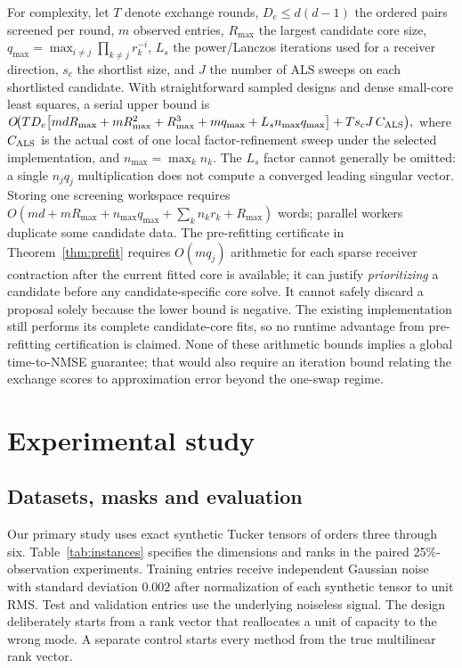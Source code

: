 \documentclass[review,10pt]{elsarticle}
\begin{document}
For complexity, let $T$ denote exchange rounds, $D_e\le d(d-1)$ the ordered pairs screened per round, $m$ observed entries, $R_{\max}$ the largest candidate core size, $q_{\max}=\max_{i\ne j}\prod_{k\ne j}r_k^{-i}$, $L_s$ the power/Lanczos iterations used for a receiver direction, $s_c$ the shortlist size, and $J$ the number of ALS sweeps on each shortlisted candidate. With straightforward sampled designs and dense small-core least squares, a serial upper bound is
 \(O\!\bigl(TD_e\bigl[mdR_{\max}+\allowbreak mR_{\max}^2+\allowbreak R_{\max}^3+\allowbreak mq_{\max}+\allowbreak L_s n_{\max}q_{\max}\bigr]+\allowbreak Ts_c J\,C_{\rm ALS}\bigr),\) 
where $C_{\rm ALS}$ is the actual cost of one local factor-refinement sweep under the selected implementation, and $n_{\max}=\max_k n_k$. The $L_s$ factor cannot generally be omitted: a single $n_jq_j$ multiplication does not compute a converged leading singular vector. Storing one screening workspace requires $O(md+mR_{\max}+n_{\max}q_{\max}+\sum_kn_kr_k+R_{\max})$ words; parallel workers duplicate some candidate data. The pre-refitting certificate in Theorem~\ref{thm:prefit} requires $O(mq_j)$ arithmetic for each sparse receiver contraction after the current fitted core is available; it can justify \emph{prioritizing} a candidate before any candidate-specific core solve. It cannot safely discard a proposal solely because the lower bound is negative. The existing implementation still performs its complete candidate-core fits, so no runtime advantage from pre-refitting certification is claimed. None of these arithmetic bounds implies a global time-to-NMSE guarantee; that would also require an iteration bound relating the exchange scores to approximation error beyond the one-swap regime.

\section{Experimental study}\label{sec:experiments}
\subsection{Datasets, masks and evaluation}\label{subsec:protocol}
Our primary study uses exact synthetic Tucker tensors of orders three through six. Table~\ref{tab:instances} specifies the dimensions and ranks in the paired 25\%-observation experiments. Training entries receive independent Gaussian noise with standard deviation $0.002$ after normalization of each synthetic tensor to unit RMS. Test and validation entries use the underlying noiseless signal. The design deliberately starts from a rank vector that reallocates a unit of capacity to the wrong mode. A separate control starts every method from the true multilinear rank vector.
\end{document}
